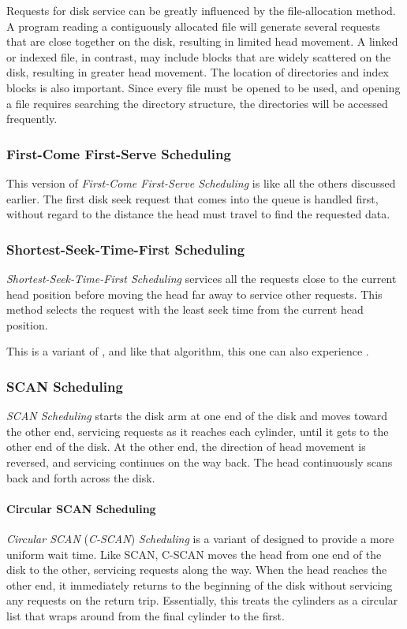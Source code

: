 Requests for disk service can be greatly influenced by the file-allocation method.
A program reading a contiguously allocated file will generate several requests that are close together on the disk, resulting in limited head movement.
A linked or indexed file, in contrast, may include blocks that are widely scattered on the disk, resulting in greater head movement.
The location of directories and index blocks is also important.
Since every file must be opened to be used, and opening a file requires searching the directory structure, the directories will be accessed frequently.

\subsubsection{First-Come First-Serve Scheduling}\label{subsubsec:FCFS_Disk_Scheduling}
This version of \emph{First-Come First-Serve Scheduling} is like all the others discussed earlier.
The first disk seek request that comes into the queue is handled first, without regard to the distance the head must travel to find the requested data.

\subsubsection{Shortest-Seek-Time-First Scheduling}\label{subsubsec:SSTF_Disk_Scheduling}
\emph{Shortest-Seek-Time-First Scheduling} services all the requests close to the current head position before moving the head far away to service other requests.
This method selects the request with the least seek time from the current head position.

This is a variant of , and like that algorithm, this one can also experience .

\subsubsection{SCAN Scheduling}\label{subsubsec:SCAN_Disk_Scheduling}
\emph{SCAN Scheduling} starts the disk arm at one end of the disk and moves toward the other end, servicing requests as it reaches each cylinder, until it gets to the other end of the disk.
At the other end, the direction of head movement is reversed, and servicing continues on the way back.
The head continuously scans back and forth across the disk.

\paragraph{Circular SCAN Scheduling}\label{par:Circular_SCAN_Disk_Scheduling}
\emph{Circular SCAN} (\emph{C-SCAN}) \emph{Scheduling} is a variant of  designed to provide a more uniform wait time.
Like SCAN, C-SCAN moves the head from one end of the disk to the other, servicing requests along the way.
When the head reaches the other end, it immediately returns to the beginning of the disk without servicing any requests on the return trip.
Essentially, this treats the cylinders as a circular list that wraps around from the final cylinder to the first.

